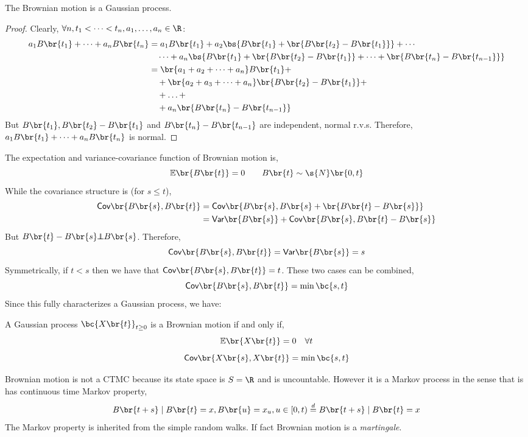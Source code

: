 \documentclass{article}
\newcommand{\indep}{\!\!\perp\!\!\!\!\perp\!\!}
\newcommand{\Cov}{\textsf{Cov}}
\newcommand{\Var}{\textsf{Var}}
\newcommand{\Exp}{\mathbb{E}}
\begin{document}
    \begin{theorem}
        The Brownian motion is a Gaussian process.
    \end{theorem}
    \begin{proof}
        Clearly, $\forall n, t_1 < \cdots < t_n, a_1, \ldots, a_n \in \R$:
        \begin{align*}
            a_1 B\br{t_1} + \cdots + a_n B\br{t_n}
            &= a_1 B\br{t_1} + a_2 \bs{B\br{t_1} + \br{B\br{t_2} - B\br{t_1}}} + \cdots \\
            &\quad \cdots + a_n \bs{B\br{t_1} + \br{B\br{t_2} - B\br{t_1}} + \cdots + \br{B\br{t_n} - B\br{t_{n-1}}}} \\
            &= \br{a_1 + a_2 + \cdots + a_n} B\br{t_1} + \\
            &\quad + \br{a_2 + a_3 + \cdots + a_n} \br{B\br{t_2} - B\br{t_1}} + \\
            &\quad + \ldots + \\
            &\quad + a_n \br{B\br{t_n} - B\br{t_{n-1}}}
        \end{align*}
        But $B\br{t_1}, B\br{t_2} - B\br{t_1}$ and $B\br{t_n} - B\br{t_{n-1}}$ are independent, normal r.v.s. Therefore, $a_1 B\br{t_1} + \cdots + a_n B\br{t_n}$ is normal.
    \end{proof}
    The expectation and variance-covariance function of Brownian motion is,
    \[ \Exp\br{B\br{t}} = 0 \qquad B\br{t} \sim \s{N}\br{0, t} \]
    While the covariance structure is (for $s \leq t$),
    \begin{align*}
       \Cov\br{B\br{s}, B\br{t}}
       &= \Cov\br{B\br{s}, B\br{s} + \br{B\br{t} - B\br{s}}} \\
       &= \Var\br{B\br{s}} + \Cov\br{B\br{s}, B\br{t} - B\br{s}}
    \end{align*}
    But $B\br{t} - B\br{s} \indep B\br{s}$. Therefore,
    \[ \Cov\br{B\br{s}, B\br{t}} = \Var\br{B\br{s}} = s \]
    Symmetrically, if $t < s$ then we have that $\Cov\br{B\br{s}, B\br{t}} = t$. These two cases can be combined,
    \[ \Cov\br{B\br{s}, B\br{t}} = \min\bc{s, t} \]
    Since this fully characterizes a Gaussian process, we have:
    \begin{theorem}
        \label{thm:necc_suff_brownian}
        A Gaussian process $\bc{X\br{t}}_{t \geq 0}$ is a Brownian motion if and only if,
        \[ \Exp\br{X\br{t}} = 0 \quad \forall t \]
        \[ \Cov\br{X\br{s}, X\br{t}} = \min \bc{s, t}\]
    \end{theorem}
    Brownian motion is not a CTMC because its state space is $S = \R$ and is uncountable. However it is a Markov process in the sense that is has continuous time Markov property,
    \[ B\br{t + s} \mid B\br{t} = x, B\br{u} = x_u, u \in \left[ 0, t \right) \stackrel{d}{=} B\br{t + s} \mid B\br{t} = x \]
    The Markov property is inherited from the simple random walks. If fact Brownian motion is a \textit{martingale}.
\end{document}
